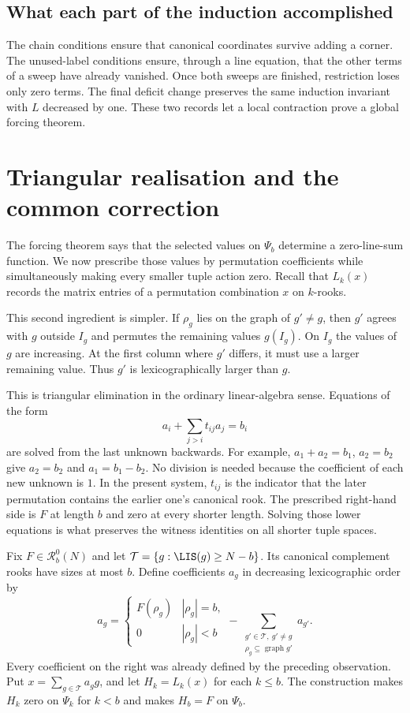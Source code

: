 \subsection{What each part of the induction accomplished}
The chain conditions ensure that canonical coordinates survive adding a corner. The unused-label conditions ensure, through a line equation, that the other terms of a sweep have already vanished. Once both sweeps are finished, restriction loses only zero terms. The final deficit change preserves the same induction invariant with $L$ decreased by one. These two records let a local contraction prove a global forcing theorem.

\section{Triangular realisation and the common correction}\label{tx:sec:realization}
The forcing theorem says that the selected values on $\Psi_b$
determine a zero-line-sum function. We now prescribe those values by
permutation coefficients while simultaneously making every smaller
tuple action zero. Recall that $L_k(x)$ records the matrix entries of
a permutation combination $x$ on $k$-rooks.

This second ingredient is simpler. If $\rho_g$ lies on the graph of $g'\ne g$, then $g'$ agrees with $g$ outside $I_g$ and permutes the remaining values $g(I_g)$. On $I_g$ the values of $g$ are increasing. At the first column where $g'$ differs, it must use a larger remaining value. Thus $g'$ is lexicographically larger than $g$.

This is triangular elimination in the ordinary linear-algebra sense.
Equations of the form
\[
                   a_i+\sum_{j>i}t_{ij}a_j=b_i
\]
are solved from the last unknown backwards. For example,
$a_1+a_2=b_1$, $a_2=b_2$ give $a_2=b_2$ and $a_1=b_1-b_2$.
No division is needed because the coefficient of each new unknown
is $1$. In the present system, $t_{ij}$ is the indicator that the
later permutation contains the earlier one's canonical rook. The
prescribed right-hand side is $F$ at length $b$ and zero at every
shorter length. Solving those lower equations is what preserves
the witness identities on all shorter tuple spaces.

Fix $F\in \mathcal R_b^{0}(N)$ and let $\mathcal T=\{g:\LIS(g)\ge N-b\}$. Its canonical complement rooks have sizes at most $b$. Define coefficients $a_g$ in decreasing lexicographic order by
\begin{equation}\label{tx:eq:triangular}
a_g=\begin{cases}F(\rho_g)&|\rho_g|=b,\\0&|\rho_g|<b\end{cases}
-\sum_{\substack{g'\in\mathcal T,\ g'\ne g\\\rho_g\subseteq\operatorname{graph}g'}}a_{g'}.
\end{equation}
Every coefficient on the right was already defined by the preceding observation. Put $x=\sum_{g\in\mathcal T}a_gg$, and let $H_k=L_k(x)$ for each $k\le b$. The construction makes $H_k$ zero on $\Psi_k$ for $k<b$ and makes $H_b=F$ on $\Psi_b$.


